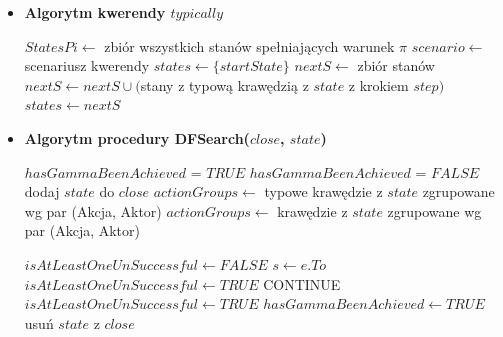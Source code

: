 \documentclass{article}
\begin{document}
\begin{itemize}
 \item \textbf{Algorytm kwerendy $typically$}\\

\begin{algorithm}[H]
\begin{algorithmic}
\State $StatesPi \gets $ zbiór wszystkich stanów spełniających warunek $\pi$ 
\State $scenario \gets $ scenariusz kwerendy
    \State $states \gets \{startState\}$
	    \State $nextS \gets $ zbiór stanów
	    	\State $nextS \gets nextS \cup ($stany z typową krawędzią z $state$ z krokiem $step)$
		\EndFor 
		\State $states \gets nextS$
	\EndFor
	        \State {}
        \EndIf
    \EndFor
\EndFor
\State {}
\end{algorithmic}
\end{algorithm}

    \item \textbf{Algorytm procedury DFSearch($close$, $state$)}\\
    
\begin{algorithm}[H]
\begin{algorithmic}
    \State $hasGammaBeenAchieved$ = $TRUE$
\Else
    \State $hasGammaBeenAchieved$ = $FALSE$
\EndIf
\State dodaj $state$ do $close$
        \State $actionGroups \gets$ typowe krawędzie z $state$ zgrupowane wg par (Akcja, Aktor)
   \EndIf
    \State $actionGroups \gets $ krawędzie z $state$ zgrupowane wg par (Akcja, Aktor)
    \EndIf

        \State $isAtLeastOneUnSuccessful \gets FALSE$
            \State $s \gets e.To$
                                     \State $isAtLeastOneUnSuccessful \gets TRUE$
                \State CONTINUE
            \EndIf
                         \State $isAtLeastOneUnSuccessful \gets TRUE$
            \EndIf
        \EndFor
                   \State $hasGammaBeenAchieved \gets TRUE$
        \EndIf
    \EndFor
\EndIf
\State usuń $state$ z $close$\\
\end{algorithmic}
\end{algorithm}
    
\end{itemize}
\newpage
\end{document}
